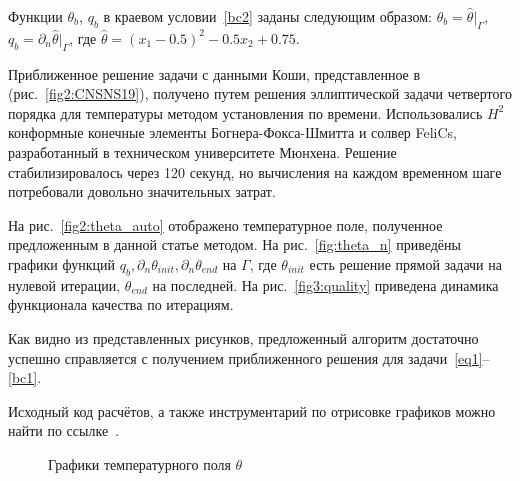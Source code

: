 Функции $\theta_b$, $q_b$ в краевом условии~\eqref{bc2} заданы следующим образом:
$\theta_b = \widehat{\theta}|_{\Gamma}$, $q_b = \partial_n \widehat{\theta}|_{\Gamma}$, где
$\widehat{\theta} = (x_1-0.5)^2 - 0.5x_2+0.75$.

Приближенное решение задачи с данными Коши, представленное в~\cite{CNSNS19} (рис.~\ref{fig2:CNSNS19}),
получено путем решения эллиптической задачи четвертого
порядка для температуры методом установления по времени.
Использовались $H^2$ конформные конечные элементы Богнера-Фокса-Шмитта и
солвер FeliCs, разработанный в техническом университете Мюнхена.
Решение стабилизировалось через 120 секунд, но вычисления на каждом временном
шаге потребовали довольно значительных затрат.

На рис.~\ref{fig2:theta_auto} отображено температурное поле, полученное
предложенным в данной статье методом.
На рис.~\ref{fig:theta_n} приведёны графики функций
$q_b, \partial_n \theta_{init}, \partial_n \theta_{end}$ на $\Gamma$, где $\theta_{init}$ есть решение прямой
задачи на нулевой итерации, $\theta_{end}$ на последней.
На рис.~\ref{fig3:quality} приведена динамика функционала качества по итерациям.


Как видно из представленных рисунков, предложенный алгоритм достаточно успешно справляется
с получением приближенного решения для задачи~\eqref{eq1}--\eqref{bc1}.

Исходный код расчётов, а также инструментарий по отрисовке графиков можно найти по ссылке~\cite{mesenev-github}.

\begin{figure}[H]
    \centering
    \caption{Графики температурного поля $\theta$}
    \label{fig2}
\end{figure}

\begin{figure}[H]
    \centering
    \caption{}
    \label{fig3}
\end{figure}
